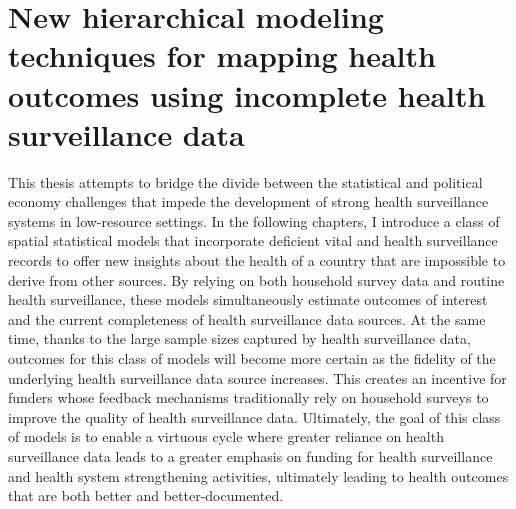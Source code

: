 \documentclass[
]{article}
\begin{document}
\hypertarget{new-hierarchical-modeling-techniques-for-mapping-health-outcomes-using-incomplete-health-surveillance-data}{%
\section{New hierarchical modeling techniques for mapping health outcomes using incomplete health surveillance data}\label{new-hierarchical-modeling-techniques-for-mapping-health-outcomes-using-incomplete-health-surveillance-data}}

This thesis attempts to bridge the divide between the statistical and political economy challenges that impede the development of strong health surveillance systems in low-resource settings. In the following chapters, I introduce a class of spatial statistical models that incorporate deficient vital and health surveillance records to offer new insights about the health of a country that are impossible to derive from other sources. By relying on both household survey data and routine health surveillance, these models simultaneously estimate outcomes of interest and the current completeness of health surveillance data sources. At the same time, thanks to the large sample sizes captured by health surveillance data, outcomes for this class of models will become more certain as the fidelity of the underlying health surveillance data source increases. This creates an incentive for funders whose feedback mechanisms traditionally rely on household surveys to improve the quality of health surveillance data. Ultimately, the goal of this class of models is to enable a virtuous cycle where greater reliance on health surveillance data leads to a greater emphasis on funding for health surveillance and health system strengthening activities, ultimately leading to health outcomes that are both better and better-documented.
\end{document}
